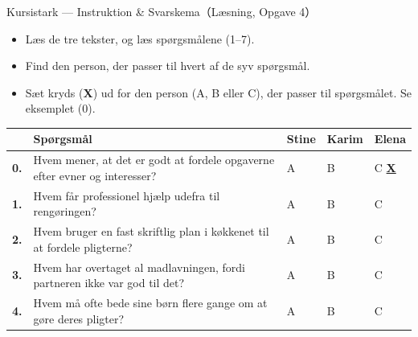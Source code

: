 \begin{emailbox}{Kursistark --- Instruktion \& Svarskema（Læsning, Opgave 4）}
\begin{itemize}
  \item Læs de tre tekster, og læs spørgsmålene (1--7).
  \item Find den person, der passer til hvert af de syv spørgsmål.
  \item Sæt kryds (\textbf{X}) ud for den person (A, B eller C), der passer til spørgsmålet. Se eksemplet (0).
\end{itemize}

\vspace{0.3em}
{\small
\renewcommand{\arraystretch}{1.3}
\begin{tabularx}{\linewidth}{@{} >{\bfseries}p{0.6cm} >{\raggedright\arraybackslash}X >{\centering\arraybackslash}p{1.65cm} >{\centering\arraybackslash}p{1.65cm} >{\centering\arraybackslash}p{1.65cm} @{}}
\toprule
 & \textbf{Spørgsmål} & \textbf{Stine} & \textbf{Karim} & \textbf{Elena} \\
\midrule
0. & Hvem mener, at det er godt at fordele opgaverne efter evner og interesser? & A \underline{\hspace{0.45cm}} & B \underline{\hspace{0.45cm}} & C \underline{\textbf{X}} \\
\midrule
1. & Hvem får professionel hjælp udefra til rengøringen? & A \underline{\hspace{0.45cm}} & B \underline{\hspace{0.45cm}} & C \underline{\hspace{0.45cm}} \\
2. & Hvem bruger en fast skriftlig plan i køkkenet til at fordele pligterne? & A \underline{\hspace{0.45cm}} & B \underline{\hspace{0.45cm}} & C \underline{\hspace{0.45cm}} \\
3. & Hvem har overtaget al madlavningen, fordi partneren ikke var god til det? & A \underline{\hspace{0.45cm}} & B \underline{\hspace{0.45cm}} & C \underline{\hspace{0.45cm}} \\
4. & Hvem må ofte bede sine børn flere gange om at gøre deres pligter? & A \underline{\hspace{0.45cm}} & B \underline{\hspace{0.45cm}} & C \underline{\hspace{0.45cm}} \\

\end{tabularx}}
\end{emailbox}
